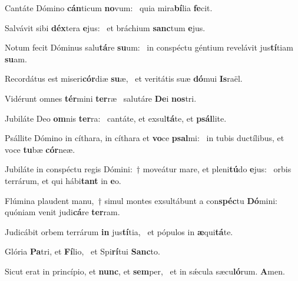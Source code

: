 \item Cantáte Dómino \textbf{cán}ticum \textbf{no}vum:~\psstar{} quia mira\textbf{bí}lia \textbf{fe}cit.
\item Salvávit sibi \textbf{déx}tera \textbf{e}jus:~\psstar{} et bráchium \textbf{sanc}tum \textbf{e}jus.
\item Notum fecit Dóminus salu\textbf{tá}re \textbf{su}um:~\psstar{} in conspéctu géntium revelávit jus\textbf{tí}tiam \textbf{su}am.
\item Recordátus est miseri\textbf{cór}diæ \textbf{su}æ,~\psstar{} et veritátis suæ \textbf{dó}mui \textbf{Is}raël.
\item Vidérunt omnes \textbf{tér}mini \textbf{ter}ræ~\psstar{} salutáre \textbf{De}i \textbf{nos}tri.
\item Jubiláte Deo \textbf{om}nis \textbf{ter}ra:~\psstar{} cantáte, et exsul\textbf{tá}te, et \textbf{psál}lite.
\item Psállite Dómino in cíthara, in cíthara et \textbf{vo}ce \textbf{psal}mi:~\psstar{} in tubis ductílibus, et voce \textbf{tu}bæ \textbf{cór}neæ.
\item Jubiláte in conspéctu regis Dómini:~† moveátur mare, et pleni\textbf{tú}do \textbf{e}jus:~\psstar{} orbis terrárum, et qui hábi\textbf{tant} in \textbf{e}o.
\item Flúmina plaudent manu,~† simul montes exsultábunt a con\textbf{spéc}tu \textbf{Dó}mini:~\psstar{} quóniam venit judi\textbf{cá}re \textbf{ter}ram.
\item Judicábit orbem terrárum \textbf{in} jus\textbf{tí}tia,~\psstar{} et pópulos in \textbf{æ}qui\textbf{tá}te.
\item Glória \textbf{Pa}tri, et \textbf{Fí}lio,~\psstar{} et Spi\textbf{rí}tui \textbf{Sanc}to.
\item Sicut erat in princípio, et \textbf{nunc}, et \textbf{sem}per,~\psstar{} et in sǽcula sæcu\textbf{ló}rum. \textbf{A}men.
